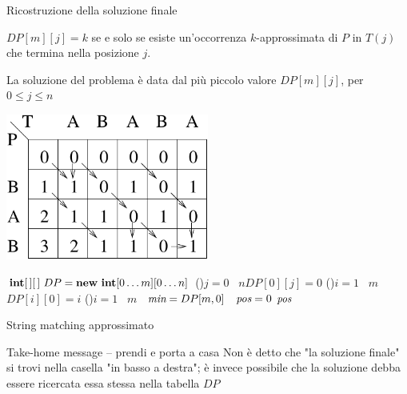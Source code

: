 \begin{frame}{Ricostruzione della soluzione finale}

\BIL
\item $DP[m][j] = k$ se e solo se esiste un’occorrenza $k$-approssimata di $P$ in $T(j)$ che
termina nella posizione $j$.
\item La soluzione del problema è data dal più piccolo valore $DP[m][j]$, per $0 \leq j \leq n$
\EIL

\begin{center}
\includegraphics[width=0.5\textwidth]{stringmatching2.pdf}
\end{center}

\end{frame}

\begin{frame}[shrink=3]{}
\vspace{-12pt}
\begin{Procedure}
\caption[A]{\INTEGER\ \stringmatching($\Item[\,]\ P,\ \Item[\,]\ T,\ \INTEGER\ m,\ \INTEGER\ n$)}

$\INTARRAY[\,]\ DP = \NEW\ \INTEGER[0 \mldots m][ 0 \mldots n]$\;
\lFor(){$j = 0$ \TO\ $n$}{$DP[0][j] = 0$}
\lFor(){$i = 1$ \TO\ $m$}{$DP[i][0] = i$}
\For(){$i = 1$ \TO\ $m$}{
}
\INTEGER\ $\textit{min} = DP[m,0]$
\INTEGER\ $\textit{pos} = 0$\;
\Return $\textit{pos}$\;
\end{Procedure}

\end{frame}

\begin{frame}{String matching approssimato}

\vspace{-6pt}
\begin{block}{Take-home message -- prendi e porta a casa}
Non è detto che "la soluzione finale" si trovi nella casella "in basso a destra"; è invece possibile che la soluzione debba essere ricercata essa 
stessa nella tabella $DP$
\end{block}

\end{frame}

